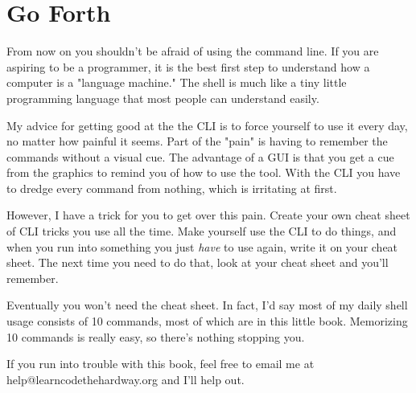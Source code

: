 \section{Go Forth}

From now on you shouldn't be afraid of using the command line.  If you are
aspiring to be a programmer, it is the best first step to understand how
a computer is a "language machine."  The shell is much like a tiny little
programming language that most people can understand easily.

My advice for getting good at the the CLI is to force yourself to use it every
day, no matter how painful it seems.  Part of the "pain" is having to remember
the commands without a visual cue.  The advantage of a GUI is that you get a
cue from the graphics to remind you of how to use the tool.  With the CLI you
have to dredge every command from nothing, which is irritating at first.

However, I have a trick for you to get over this pain.  Create your own cheat
sheet of CLI tricks you use all the time.  Make yourself use the CLI to do
things, and when you run into something you just \emph{have} to use again, 
write it on your cheat sheet.  The next time you need to do that, look at
your cheat sheet and you'll remember.

Eventually you won't need the cheat sheet.  In fact, I'd say most of my
daily shell usage consists of 10 commands, most of which are in this little
book.  Memorizing 10 commands is really easy, so there's nothing stopping you.

If you run into trouble with this book, feel free to email me at 
help@learncodethehardway.org and I'll help out.
